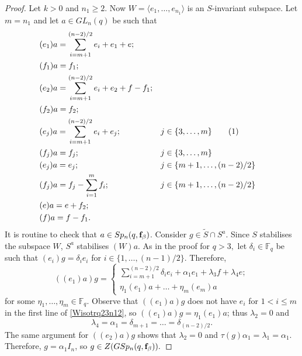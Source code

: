 \begin{proof}
Let $k>0$ and $n_1 \ge 2.$ Now $W=\langle e_1, \ldots, e_{n_1} \rangle$ is an $S$-invariant subspace. Let $m=n_1$ and  let $a \in GL_n(q)$ be such that
\begingroup
\allowdisplaybreaks
\begin{align*}
&(e_1)a =\sum_{i=m+1}^{(n-2)/2} e_i +e_1 + e; \\ & (f_1)a=f_1; \\
&(e_2)a =\sum_{i=m+1}^{(n-2)/2} e_i +e_2 + f -f_1; \\ & (f_2)a=f_2; \\
&(e_{j})a = \sum_{i=m+1}^{(n-2)/2}e_i + e_j; & &  j\in \{3, \ldots, m \} \stepcounter{equation}\tag{\theequation} \label{aSp2n12} \\ &(f_{j})a=f_{j}; & &  j\in \{3, \ldots, m \}  \\
&(e_{j})a =e_{j};  && j\in \{m+1, \ldots, (n-2)/2 \}   \\ &(f_{j})a=f_{j} - \sum_{i=1}^m f_{i}; && j\in \{m+1, \ldots, (n-2)/2 \}   \\
& (e)a=e+f_2; \\ & (f)a=f-f_1.
\end{align*}
\endgroup
It is routine to check that $a \in Sp_n(q, {\bf f}_{\beta})$. Consider $g \in \tilde{S} \cap S^a.$  Since $S$ stabilises the subspace $W$,  $S^a$ stabilises $(W)a.$ As in the proof for $q>3,$ let $\delta_i \in \mathbb{F}_q$ be such that $(e_i)g=\delta_i e_i$ for $i \in\{1, \ldots, (n-1)/2\}.$  Therefore, 
\begin{equation}\label{Wisotrq23n12}
((e_1)a)g=
\begin{cases}
\sum_{i=m+1}^{(n-2)/2}\delta_i e_i +\alpha_1e_1 + \lambda_3 f +\lambda_4 e;\\
\eta_1 (e_1)a+ \ldots +\eta_m(e_m)a
\end{cases}
\end{equation}
for some $\eta_1, \ldots, \eta_m \in \mathbb{F}_q.$ Observe that $((e_1)a)g$ does not have $e_i$ for $1<i  \le m$  in the first line of \eqref{Wisotrq23n12}, so $((e_1 )a)g = \eta_1 (e_1 )a$; thus $\lambda_2=0$ and
$$\lambda_4=\alpha_1=\delta_{m+1}= \ldots= \delta_{(n-2)/2}.$$
The same argument for $((e_2)a)g$ shows that $\lambda_2=0$ and $\tau(g)\alpha_1=\lambda_1=\alpha_1.$ 
Therefore, $g=\alpha_1 I_n$, so $g \in Z(GSp_n(q, {\bf f}_{\beta})).$



\end{proof}
